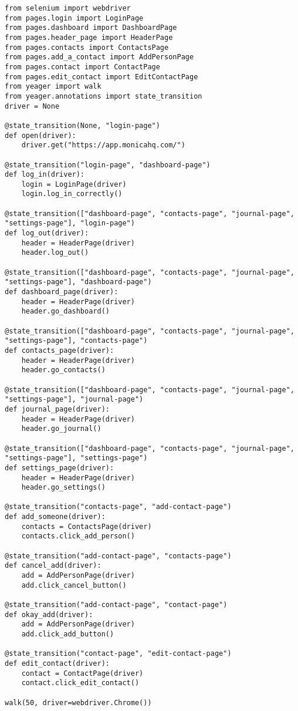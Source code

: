 \begin{Verbatim}[fontsize=\small]
from selenium import webdriver
from pages.login import LoginPage
from pages.dashboard import DashboardPage
from pages.header_page import HeaderPage
from pages.contacts import ContactsPage
from pages.add_a_contact import AddPersonPage
from pages.contact import ContactPage
from pages.edit_contact import EditContactPage
from yeager import walk
from yeager.annotations import state_transition
driver = None

@state_transition(None, "login-page")
def open(driver):
    driver.get("https://app.monicahq.com/")

@state_transition("login-page", "dashboard-page")
def log_in(driver):
    login = LoginPage(driver)
    login.log_in_correctly()

@state_transition(["dashboard-page", "contacts-page", "journal-page", "settings-page"], "login-page")
def log_out(driver):
    header = HeaderPage(driver)
    header.log_out()

@state_transition(["dashboard-page", "contacts-page", "journal-page", "settings-page"], "dashboard-page")
def dashboard_page(driver):
    header = HeaderPage(driver)
    header.go_dashboard()

@state_transition(["dashboard-page", "contacts-page", "journal-page", "settings-page"], "contacts-page")
def contacts_page(driver):
    header = HeaderPage(driver)
    header.go_contacts()

@state_transition(["dashboard-page", "contacts-page", "journal-page", "settings-page"], "journal-page")
def journal_page(driver):
    header = HeaderPage(driver)
    header.go_journal()

@state_transition(["dashboard-page", "contacts-page", "journal-page", "settings-page"], "settings-page")
def settings_page(driver):
    header = HeaderPage(driver)
    header.go_settings()

@state_transition("contacts-page", "add-contact-page")
def add_someone(driver):
    contacts = ContactsPage(driver)
    contacts.click_add_person()

@state_transition("add-contact-page", "contacts-page")
def cancel_add(driver):
    add = AddPersonPage(driver)
    add.click_cancel_button()

@state_transition("add-contact-page", "contact-page")
def okay_add(driver):
    add = AddPersonPage(driver)
    add.click_add_button()

@state_transition("contact-page", "edit-contact-page")
def edit_contact(driver):
    contact = ContactPage(driver)
    contact.click_edit_contact()

walk(50, driver=webdriver.Chrome())

\end{Verbatim}

